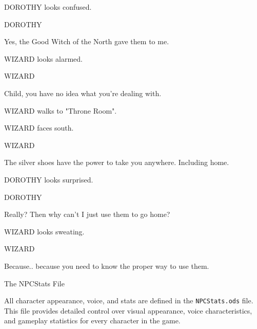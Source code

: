 \documentclass[11pt,letterpaper,oldstylefigures]{memoir}
\makeatletter
\newcommand{\speaker}[1]{\nobreak\hspace*{0.333\textwidth}\MakeUppercase{#1}\par\nobreak\vspace{0.5\baselineskip}}
\newcommand{\dialogue}[1]{\nobreak\hspace*{0.25\textwidth}\begin{minipage}{0.5\textwidth}#1\end{minipage}\par\vspace{1\baselineskip}}
\newcommand{\stagedir}[1]{#1\par\vspace{1\baselineskip}}
\newenvironment{FountainExample}
  {\begingroup
  \ttfamily\small
   \setlength{\parindent}{0pt}
  \setlength{\parskip}{0.5em}
  \allowdisplaybreaks
  \setlength{\displaywidowpenalty}{0}
  \setlength{\widowpenalty}{0}
  \setlength{\clubpenalty}{0}
  \setlength{\interlinepenalty}{0}
}
  {\endgroup}
\let\oldchapter\chapter
\def\chapter{%
  \@ifstar
    {\FountainScripting@starchapter}%
    {\@dblarg\FountainScripting@chapter}}
\def\FountainScripting@starchapter#1{\oldchapter*{#1}\chaptermark{#1}}
\def\FountainScripting@chapter[#1]#2{\oldchapter[#1]{#2}\chaptermark{#2}}
\makeatother
\begin{document}
\begin{FountainExample}
\stagedir{DOROTHY looks confused.}

\speaker{DOROTHY}
\dialogue{Yes, the Good Witch of the North gave them to me.}

\stagedir{WIZARD looks alarmed.}

\speaker{WIZARD}
\dialogue{Child, you have no idea what you're dealing with.}

\stagedir{WIZARD walks to "Throne Room".}

\stagedir{WIZARD faces south.}

\speaker{WIZARD}
\dialogue{The silver shoes have the power to take you anywhere. Including home.}

\stagedir{DOROTHY looks surprised.}

\speaker{DOROTHY}
\dialogue{Really? Then why can't I just use them to go home?}

\stagedir{WIZARD looks sweating.}

\speaker{WIZARD}
\dialogue{Because.. because you need to know the proper way to use them.}
\end{FountainExample}

\chapter{The NPCStats File}
\label{chap:npcstats-file}

All character appearance, voice, and stats are defined in the \texttt{NPCStats.ods} file. This file provides detailed control over visual appearance, voice characteristics, and gameplay statistics for every character in the game.
\end{document}

